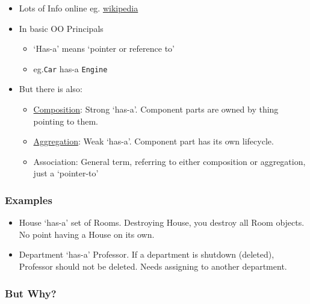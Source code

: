 \begin{itemize}
\itemsep1pt\parskip0pt
\item
  Lots of Info online eg.
  \href{https://en.wikipedia.org/wiki/Composition_over_inheritance}{wikipedia}
\item
  In basic OO Principals

  \begin{itemize}
  \itemsep1pt\parskip0pt
  \item
    `Has-a' means `pointer or reference to'
  \item
    eg.\texttt{Car} has-a \texttt{Engine}
  \end{itemize}
\item
  But there is also:

  \begin{itemize}
  \itemsep1pt\parskip0pt
  \item
    \href{https://en.wikipedia.org/wiki/Object_composition\#Composition}{Composition}:
    Strong `has-a'. Component parts are owned by thing pointing to them.
  \item
    \href{https://en.wikipedia.org/wiki/Object_composition\#Aggregation}{Aggregation}:
    Weak `has-a'. Component part has its own lifecycle.
  \item
    Association: General term, referring to either composition or
    aggregation, just a `pointer-to'
  \end{itemize}
\end{itemize}

\subsubsection{Examples}\label{examples}

\begin{itemize}
\itemsep1pt\parskip0pt
\item
  House `has-a' set of Rooms. Destroying House, you destroy all Room
  objects. No point having a House on its own.
\item
  Department `has-a' Professor. If a department is shutdown (deleted),
  Professor should not be deleted. Needs assigning to another
  department.
\end{itemize}

\subsubsection{But Why?}\label{but-why}

